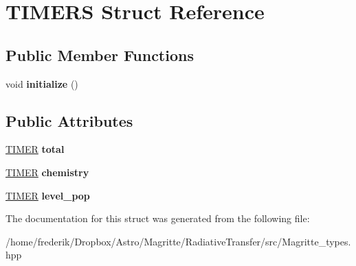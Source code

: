 \hypertarget{structTIMERS}{}\section{T\+I\+M\+E\+RS Struct Reference}
\label{structTIMERS}
\subsection*{Public Member Functions}
\begin{DoxyCompactItemize}
\item 
\mbox{\label{structTIMERS_a22e57b89f832d4a0589561c7f9dc4fdf}} 
void {\bfseries initialize} ()
\end{DoxyCompactItemize}
\subsection*{Public Attributes}
\begin{DoxyCompactItemize}
\item 
\mbox{\label{structTIMERS_aefa52c777055e7171d1a53d88d88fc3b}} 
\mbox{\hyperlink{structTIMER}{T\+I\+M\+ER}} {\bfseries total}
\item 
\mbox{\label{structTIMERS_ab636d88b58ad0202e63c382616757181}} 
\mbox{\hyperlink{structTIMER}{T\+I\+M\+ER}} {\bfseries chemistry}
\item 
\mbox{\label{structTIMERS_a6ac47e093a2254db202ddb35c1c8d4dd}} 
\mbox{\hyperlink{structTIMER}{T\+I\+M\+ER}} {\bfseries level\+\_\+pop}
\end{DoxyCompactItemize}


The documentation for this struct was generated from the following file\+:\begin{DoxyCompactItemize}
\item 
/home/frederik/\+Dropbox/\+Astro/\+Magritte/\+Radiative\+Transfer/src/Magritte\+\_\+types.\+hpp\end{DoxyCompactItemize}
